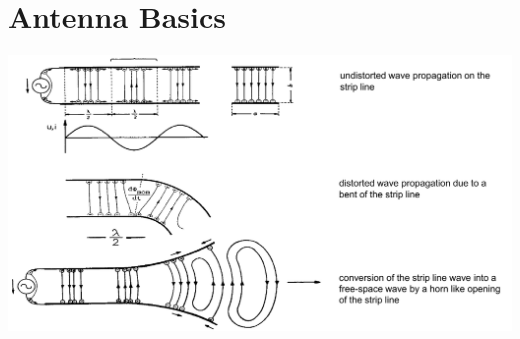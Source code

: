 \section{Antenna Basics}
\includegraphics[width=.4\paperheight]{content/aawp/pictures/detachment_of_waves.png}
